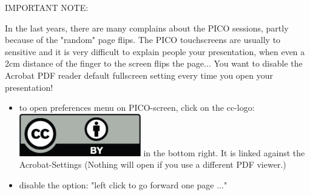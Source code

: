 \documentclass[usepdftitle=false,unknownkeysallowed,8pt]{beamer}
\begin{document}
\begin{frame}

  IMPORTANT NOTE:

  In the last years, there are many complains about the PICO sessions, partly because of the "random" page flips. The PICO touchscreens are usually to sensitive and it is very difficult to explain people your presentation, when even a 2cm distance of the finger to the screen flips the page... You want to disable the Acrobat PDF reader default fullscreen setting every time you open your presentation! 

\vspace{0.5cm}


\begin{itemize}
  \item to open preferences menu on PICO-screen, click on the cc-logo: \includegraphics[height=0.04\textheight]{figures/CreativeCommons_Attribution_License} in the bottom right. It is linked against the Acrobat-Settings (Nothing will open if you use a different PDF viewer.)
  \item disable the option: "left click to go forward one page ..."
\end{itemize}


\end{frame}

\end{document}

